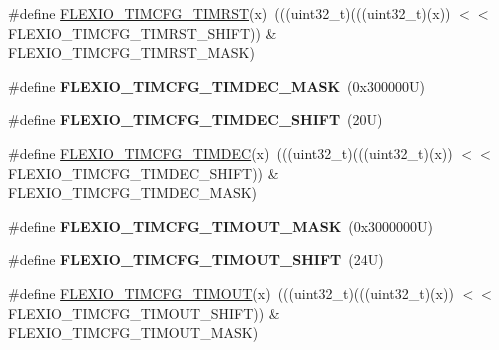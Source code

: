 \begin{DoxyCompactItemize}
\item 
\#define \mbox{\hyperlink{group___f_l_e_x_i_o___register___masks_ga08ca7ed1bb749a7badb47a218d267144}{F\+L\+E\+X\+I\+O\+\_\+\+T\+I\+M\+C\+F\+G\+\_\+\+T\+I\+M\+R\+ST}}(x)~(((uint32\+\_\+t)(((uint32\+\_\+t)(x)) $<$$<$ F\+L\+E\+X\+I\+O\+\_\+\+T\+I\+M\+C\+F\+G\+\_\+\+T\+I\+M\+R\+S\+T\+\_\+\+S\+H\+I\+FT)) \& F\+L\+E\+X\+I\+O\+\_\+\+T\+I\+M\+C\+F\+G\+\_\+\+T\+I\+M\+R\+S\+T\+\_\+\+M\+A\+SK)
\item 
\mbox{\label{group___f_l_e_x_i_o___register___masks_ga630b6f7a87e13b8895f0539de1ea7605}} 
\#define {\bfseries F\+L\+E\+X\+I\+O\+\_\+\+T\+I\+M\+C\+F\+G\+\_\+\+T\+I\+M\+D\+E\+C\+\_\+\+M\+A\+SK}~(0x300000\+U)
\item 
\mbox{\label{group___f_l_e_x_i_o___register___masks_gab160edca0d0ee58976037f7e374e9f3e}} 
\#define {\bfseries F\+L\+E\+X\+I\+O\+\_\+\+T\+I\+M\+C\+F\+G\+\_\+\+T\+I\+M\+D\+E\+C\+\_\+\+S\+H\+I\+FT}~(20\+U)
\item 
\#define \mbox{\hyperlink{group___f_l_e_x_i_o___register___masks_ga9a093fb49dcb9d78cfbb9c197c1e48f3}{F\+L\+E\+X\+I\+O\+\_\+\+T\+I\+M\+C\+F\+G\+\_\+\+T\+I\+M\+D\+EC}}(x)~(((uint32\+\_\+t)(((uint32\+\_\+t)(x)) $<$$<$ F\+L\+E\+X\+I\+O\+\_\+\+T\+I\+M\+C\+F\+G\+\_\+\+T\+I\+M\+D\+E\+C\+\_\+\+S\+H\+I\+FT)) \& F\+L\+E\+X\+I\+O\+\_\+\+T\+I\+M\+C\+F\+G\+\_\+\+T\+I\+M\+D\+E\+C\+\_\+\+M\+A\+SK)
\item 
\mbox{\label{group___f_l_e_x_i_o___register___masks_ga8dc21aa2bf34a287c7e69adeed2b955f}} 
\#define {\bfseries F\+L\+E\+X\+I\+O\+\_\+\+T\+I\+M\+C\+F\+G\+\_\+\+T\+I\+M\+O\+U\+T\+\_\+\+M\+A\+SK}~(0x3000000\+U)
\item 
\mbox{\label{group___f_l_e_x_i_o___register___masks_ga71b74bfc36bfc4485ec8d8ae5e8fb020}} 
\#define {\bfseries F\+L\+E\+X\+I\+O\+\_\+\+T\+I\+M\+C\+F\+G\+\_\+\+T\+I\+M\+O\+U\+T\+\_\+\+S\+H\+I\+FT}~(24\+U)
\item 
\#define \mbox{\hyperlink{group___f_l_e_x_i_o___register___masks_ga109c7fcac4d63d9d1103b8528860f502}{F\+L\+E\+X\+I\+O\+\_\+\+T\+I\+M\+C\+F\+G\+\_\+\+T\+I\+M\+O\+UT}}(x)~(((uint32\+\_\+t)(((uint32\+\_\+t)(x)) $<$$<$ F\+L\+E\+X\+I\+O\+\_\+\+T\+I\+M\+C\+F\+G\+\_\+\+T\+I\+M\+O\+U\+T\+\_\+\+S\+H\+I\+FT)) \& F\+L\+E\+X\+I\+O\+\_\+\+T\+I\+M\+C\+F\+G\+\_\+\+T\+I\+M\+O\+U\+T\+\_\+\+M\+A\+SK)
\end{DoxyCompactItemize}
